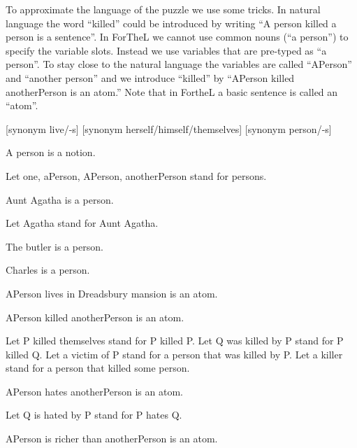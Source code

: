 \documentclass{article}
\begin{document}
To approximate the language of the puzzle we use some tricks.
In natural language the word ``killed'' could be introduced by writing
``A person killed a person is a sentence''. In ForTheL we cannot use
common nouns (``a person'') to specify the variable slots. Instead
we use variables that are pre-typed as ``a person''. To stay close
to the natural language the variables are called ``APerson'' and
``another person'' and we introduce ``killed'' by
``APerson killed anotherPerson is an atom.''
Note that in FortheL a basic sentence is called an ``atom''. \\

\begin{forthel}

[synonym live/-s]
[synonym herself/himself/themselves]
[synonym person/-s]

\begin{signature}
A person is a notion.
\end{signature}

Let one, aPerson, APerson, anotherPerson  stand for persons.

\begin{signature}
Aunt Agatha is a person.
\end{signature}

Let Agatha stand for Aunt Agatha.

\begin{signature}
The butler is a person.
\end{signature}

\begin{signature}
Charles is a person.
\end{signature}

\begin{signature}
APerson lives in Dreadsbury mansion is an atom.
\end{signature}

\begin{signature}
APerson killed anotherPerson is an atom.
\end{signature}

Let P killed themselves stand for P killed P.
Let Q was killed by P stand for P killed Q.
Let a victim of P stand for a person that was killed by P.
Let a killer stand for a person that killed some person.

\begin{signature}
APerson hates anotherPerson is an atom.
\end{signature}

Let Q is hated by P stand for P hates Q.

\begin{signature}
APerson is richer than anotherPerson is an atom.
\end{signature}

\end{forthel}
\end{document}
